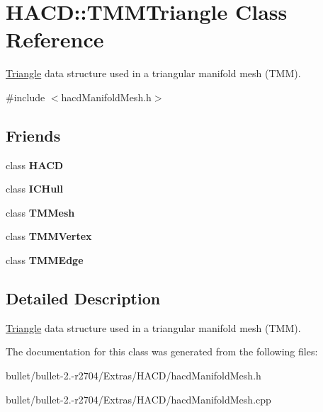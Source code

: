 \hypertarget{class_h_a_c_d_1_1_t_m_m_triangle}{\section{H\+A\+C\+D\+:\+:T\+M\+M\+Triangle Class Reference}
\label{class_h_a_c_d_1_1_t_m_m_triangle}
}


\hyperlink{class_triangle}{Triangle} data structure used in a triangular manifold mesh (T\+M\+M).  




{\ttfamily \#include $<$hacd\+Manifold\+Mesh.\+h$>$}

\subsection*{Friends}
\begin{DoxyCompactItemize}
\item 
\hypertarget{class_h_a_c_d_1_1_t_m_m_triangle_ab3497bc7797561d0c79ecef2f462e43a}{class {\bfseries H\+A\+C\+D}}\label{class_h_a_c_d_1_1_t_m_m_triangle_ab3497bc7797561d0c79ecef2f462e43a}

\item 
\hypertarget{class_h_a_c_d_1_1_t_m_m_triangle_af8c54a3b946020c72439a823fc62e570}{class {\bfseries I\+C\+Hull}}\label{class_h_a_c_d_1_1_t_m_m_triangle_af8c54a3b946020c72439a823fc62e570}

\item 
\hypertarget{class_h_a_c_d_1_1_t_m_m_triangle_a444d6b56620e89d598962bee57ddd380}{class {\bfseries T\+M\+Mesh}}\label{class_h_a_c_d_1_1_t_m_m_triangle_a444d6b56620e89d598962bee57ddd380}

\item 
\hypertarget{class_h_a_c_d_1_1_t_m_m_triangle_a659602e9e98a787cbc2a635bd5277451}{class {\bfseries T\+M\+M\+Vertex}}\label{class_h_a_c_d_1_1_t_m_m_triangle_a659602e9e98a787cbc2a635bd5277451}

\item 
\hypertarget{class_h_a_c_d_1_1_t_m_m_triangle_a5f453e8c231c9e8cf5bcd76e8e569b2d}{class {\bfseries T\+M\+M\+Edge}}\label{class_h_a_c_d_1_1_t_m_m_triangle_a5f453e8c231c9e8cf5bcd76e8e569b2d}

\end{DoxyCompactItemize}


\subsection{Detailed Description}
\hyperlink{class_triangle}{Triangle} data structure used in a triangular manifold mesh (T\+M\+M). 

The documentation for this class was generated from the following files\+:\begin{DoxyCompactItemize}
\item 
bullet/bullet-\/2.-\/r2704/\+Extras/\+H\+A\+C\+D/hacd\+Manifold\+Mesh.\+h\item 
bullet/bullet-\/2.-\/r2704/\+Extras/\+H\+A\+C\+D/hacd\+Manifold\+Mesh.\+cpp\end{DoxyCompactItemize}
